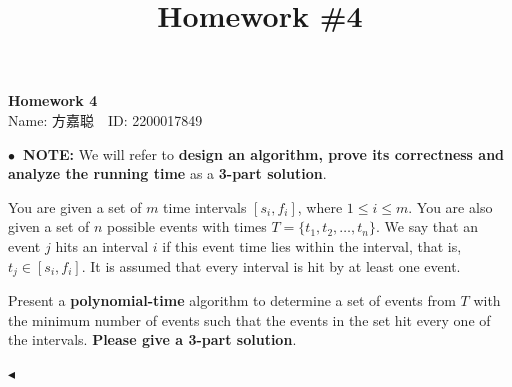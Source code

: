 \documentclass[11pt]{article}
\title{Homework \#4}
\newenvironment{problem}[2][Problem]{\begin{trivlist}
\item[\hskip \labelsep{\bfseries#1}\hskip\labelsep{\bfseries#2.}]}{\hfill$\blacktriangleleft$\end{trivlist}}
\begin{document}
\kaishu

\pagestyle{fancy}
\chead{}

\begin{center}
    {\LARGE \bf Homework 4}\\
    {Name: 方嘉聪\ \  ID: 2200017849}            %
\end{center}

\textbf{$\bullet$~NOTE: } We will refer to \textbf{design an algorithm, prove its correctness and analyze the running time} as a \textbf{3-part solution}.

\begin{problem}{1 (Occupied Scheduling)}
    You are given a set of $m$ time intervals $[s_i, f_i]$, where $1\leqslant i\leqslant m$. You are also given a set of $n$ possible events
    with times $T=\{t_1,t_2,\ldots,t_n\}$. We say that an event $j$ hits an interval $i$ if this event time lies within the interval, that is, $t_j\in[s_i,f_i]$. It is assumed that every interval is hit by at least one event.
    
    Present a \textbf{polynomial-time} algorithm to determine a set of events from $T$ with the minimum number of events such that the events in the set hit every one of the intervals. \textbf{Please give a 3-part solution}.

\end{problem}
\end{document}
